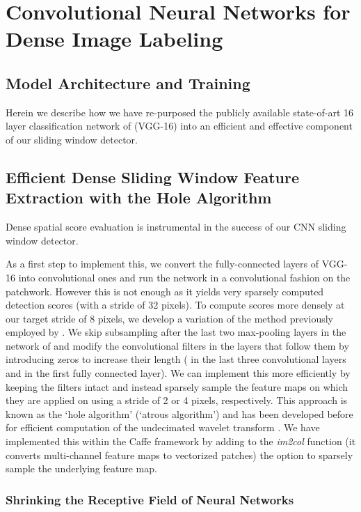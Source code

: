 \section{Convolutional Neural Networks for Dense Image Labeling}

\subsection{Model Architecture and Training}

Herein we describe how we have re-purposed the publicly available state-of-art
16 layer classification network of \cite{SiZi14} (VGG-16) into an efficient
and effective component of our sliding window detector.

\subsection{Efficient Dense Sliding Window Feature Extraction with the Hole Algorithm}

Dense spatial score evaluation is instrumental in the success of our CNN
sliding window detector. 

As a first step to implement this, we convert the fully-connected layers
of VGG-16 into convolutional ones and run the network in a convolutional
fashion on the patchwork. However this is not enough as it yields very
sparsely computed detection scores (with a stride of 32 pixels). To compute
scores more densely at our target stride of 8 pixels, we develop a variation
of the method previously employed by \cite{GCMG+13, SEZM+14}. We skip
subsampling after the last two max-pooling layers in the network of
\cite{SiZi14} and modify the convolutional filters in the layers that follow
them by introducing zeros to increase their length ( in the last three
convolutional layers and  in the first fully connected layer). We can
implement this more efficiently by keeping the filters intact and instead
sparsely sample the feature maps on which they are applied on using a stride
of 2 or 4 pixels, respectively. This approach is known as the `hole algorithm'
(`atrous algorithm') and has been developed before for efficient computation
of the undecimated wavelet transform \cite{Mall99}. We have implemented this
within the Caffe framework by adding to the \textsl{im2col} function (it
converts multi-channel feature maps to vectorized patches) the option to
sparsely sample the underlying feature map.

\subsubsection{Shrinking the Receptive Field of Neural Networks}

